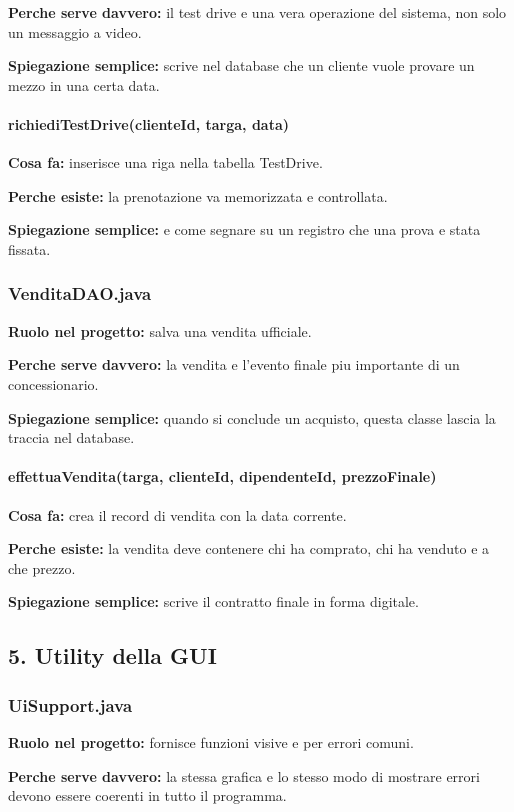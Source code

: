 \documentclass[12pt,a4paper]{article}
\begin{document}
\textbf{Perche serve davvero:} il test drive e una vera operazione del sistema, non solo un messaggio a video.

\textbf{Spiegazione semplice:} scrive nel database che un cliente vuole provare un mezzo in una certa data.

\paragraph{richiediTestDrive(clienteId, targa, data)}
\textbf{Cosa fa:} inserisce una riga nella tabella TestDrive.

\textbf{Perche esiste:} la prenotazione va memorizzata e controllata.

\textbf{Spiegazione semplice:} e come segnare su un registro che una prova e stata fissata.

\subsubsection*{VenditaDAO.java}
\textbf{Ruolo nel progetto:} salva una vendita ufficiale.

\textbf{Perche serve davvero:} la vendita e l'evento finale piu importante di un concessionario.

\textbf{Spiegazione semplice:} quando si conclude un acquisto, questa classe lascia la traccia nel database.

\paragraph{effettuaVendita(targa, clienteId, dipendenteId, prezzoFinale)}
\textbf{Cosa fa:} crea il record di vendita con la data corrente.

\textbf{Perche esiste:} la vendita deve contenere chi ha comprato, chi ha venduto e a che prezzo.

\textbf{Spiegazione semplice:} scrive il contratto finale in forma digitale.

\subsection{5. Utility della GUI}

\subsubsection*{UiSupport.java}
\textbf{Ruolo nel progetto:} fornisce funzioni visive e per errori comuni.

\textbf{Perche serve davvero:} la stessa grafica e lo stesso modo di mostrare errori devono essere coerenti in tutto il programma.
\end{document}
